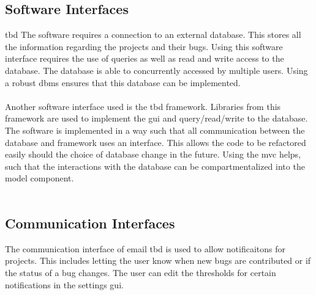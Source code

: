 \documentclass{article}
\newcommand{\comment}[1]{}
\begin{document}
\subsection{Software Interfaces}
\comment{
Describe the connections between this product and other specific software components (name and version) including databases, operating systems, tools, libraries, and integrated commercial components. Identify the data items or messages coming into the system and going out and describe the purpose of each. Describe the services needed and the nature of communications. Refer to documents that describe detailed application programmin interface protocols. Identify data that will be shared across software components. If the data sharing mechanisim must be implemented in a specific way (for example, use of a global data area in a multitasking operating system), specify this as an implementation constraint.
}
\acrshort{tbd}
The software requires a connection to an external database. This stores all the information regarding the projects and their bugs. Using this software interface requires the use of queries as well as read and write access to the database. The database is able to concurrently accessed by multiple users. Using a robust \acrshort{dbms} ensures that this database can be implemented.
\\ \\ 
Another software interface used is the \acrshort{tbd} framework. Libraries from this framework are used to implement the \acrshort{gui} and query/read/write to the database. The software is implemented in a way such that all communication between the database and framework uses an interface. This allows the code to be refactored easily should the choice of database change in the future. Using the \acrshort{mvc} helps, such that the interactions with the database can be compartmentalized into the model component.
\\ \\ 
\subsection{Communication Interfaces}
\comment{
Describe the requirements associated with any communication functions required by this product, including e-mail, web-browswer, network server communication protocols, electronic forms, and so on. Define any pertinant message formatting. Identify any communication standards that will be used, such as FTP or HTTP. Specify any communication security or encryption issues, data transfer rates, and synchronization mechanisms.
}
The communication interface of email \acrshort{tbd} is used to allow notificaitons for projects. This includes letting the user know when new bugs are contributed or if the status of a bug changes. The user can edit the thresholds for certain notifications in the settings \acrshort{gui}.
\end{document}

